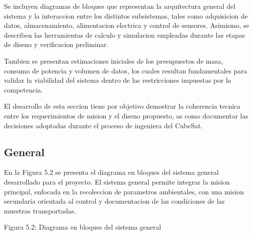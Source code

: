 Se incluyen diagramas de bloques que representan la arquitectura general del sistema y la
interaccion entre los distintos subsistemas, tales como adquisicion de datos, almacenamiento,
alimentacion electrica y control de sensores. Asimismo, se describen las herramientas de
calculo y simulacion empleadas durante las etapas de diseno y verificacion preliminar.

Tambien se presentan estimaciones iniciales de los presupuestos de masa, consumo de
potencia y volumen de datos, los cuales resultan fundamentales para validar la viabilidad del
sistema dentro de las restricciones impuestas por la competencia.

El desarrollo de esta seccion tiene por objetivo demostrar la coherencia tecnica entre los
requerimientos de mision y el diseno propuesto, as como documentar las decisiones adoptadas
durante el proceso de ingeniera del CubeSat.

  \subsection{General}
    En la Figura 5.2 se presenta el diagrama en bloques del sistema general desarrollado para
    el proyecto.
    El sistema general permite integrar la mision principal, enfocada en la recoleccion de
    parametros ambientales, con una mision secundaria orientada al control y documentacion de
    las condiciones de las muestras transportadas.

    Figura 5.2: Diagrama en bloques del sistema general

